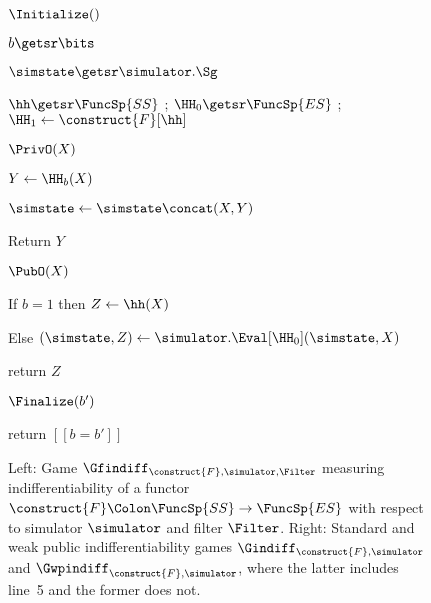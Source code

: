 \begin{figure}[t]
{	\begin{algorithm-initial}{$\Initialize()$}
		\item $b \getsr \bits$
		\item $\simstate \getsr \simulator.\Sg$
		\item $\hh \getsr \FuncSp{SS}$
		; $\HH_0 \getsr \FuncSp{ES}$ ; $\HH_1 \gets \construct{F}[\hh]$
	\end{algorithm-initial}
	\begin{algorithm-subsequent}{$\PrivO(X)$}
		\item $Y \gets \HH_b(X)$
		\item $\simstate\gets\simstate \concat (X, Y)$ 
		\item Return $Y$
	\end{algorithm-subsequent}
	\ExptSepSpace
	\begin{algorithm-subsequent}{$\PubO(X)$}
		\item If $b=1$ then $Z\gets \hh(X)$
		\item Else $(\simstate,Z) \gets \simulator.\Eval[\HH_0] (\simstate,X)$
		\item return $Z$
	\end{algorithm-subsequent}
		\ExptSepSpace
	\begin{algorithm-subsequent}{$\Finalize(b')$}
		\item return $[[b = b']]$
	\end{algorithm-subsequent}
}
	\vspace{-5pt}
	\caption{Left: Game  $\Gfindiff_{\construct{F},  \simulator, \Filter}$ measuring indifferentiability of a functor $\construct{F}\Colon \FuncSp{SS}\to\FuncSp{ES}$ with respect to simulator $\simulator$ and filter $\Filter$. Right: Standard and weak public indifferentiability games $\Gindiff_{\construct{F},  \simulator}$ and $\Gwpindiff_{\construct{F},  \simulator}$, where the latter includes line~5 and the former does not.
	}
	\label{fig-gm-indiff}
	\hrulefill
\end{figure}


